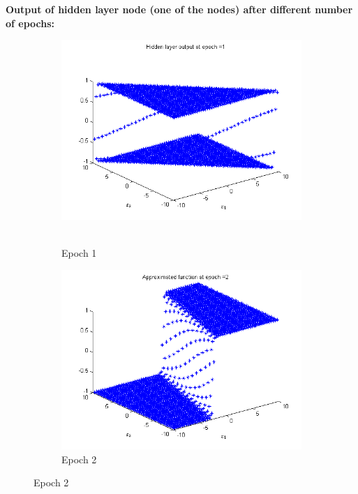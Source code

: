 \documentclass{article}
\begin{document}
\newpage

\textbf{Output of hidden layer node (one of the nodes) after different number of epochs:}

\begin{figure}
\begin{subfigure}{.5\textwidth}
  \centering
  \includegraphics[width=.8\linewidth]{Regression/bivariate/hidden_1layer_1.png}\
  \caption{Epoch 1}
\end{subfigure}%
\begin{subfigure}{.5\textwidth}
  \centering
  \includegraphics[width=.8\linewidth]{Regression/bivariate/hidden_1layer_2.png}
   \caption{Epoch 2}
  \end{subfigure}
  

\end{figure}
\end{document}
